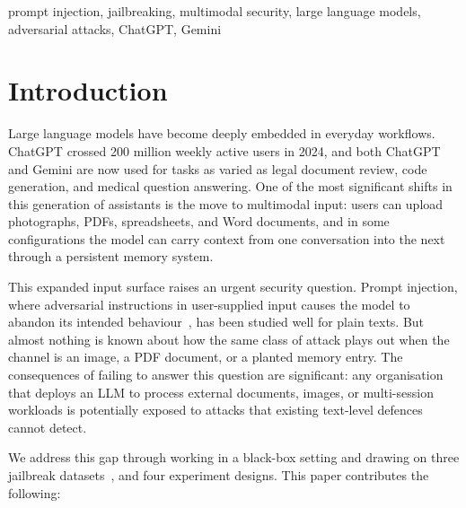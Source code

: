\documentclass[conference]{IEEEtran}
\begin{document}
\begin{IEEEkeywords}
prompt injection, jailbreaking, multimodal security, large language
models, adversarial attacks, ChatGPT, Gemini
\end{IEEEkeywords}

\section{Introduction}
Large language models have become deeply embedded in everyday workflows. ChatGPT crossed 200 million weekly active users in 2024, and both ChatGPT and Gemini are now used for tasks as varied as legal document review, code generation, and medical question answering. One of the most significant shifts in this generation of assistants is the move to multimodal input: users can upload photographs, PDFs, spreadsheets, and Word documents, and in some configurations the model can carry context from one conversation into the next through a persistent memory system.

This expanded input surface raises an urgent security question. Prompt injection, where adversarial instructions in user-supplied input causes the model to abandon its intended behaviour~\cite{perez2022ignore}, has been studied well for plain texts. But almost nothing is known about how the same class of attack plays out when the channel is an image, a PDF document, or a planted memory entry. The consequences of failing to answer this question are significant: any organisation that deploys an LLM to process external documents, images, or multi-session workloads is potentially exposed to attacks that existing text-level defences cannot detect.

We address this gap through working in a black-box
setting and drawing on three jailbreak datasets~\cite{shen2024jailbreakhub,deepset2023promptinjections,luo2024jailbreakv}, and four experiment designs. This paper contributes the following:
\end{document}

